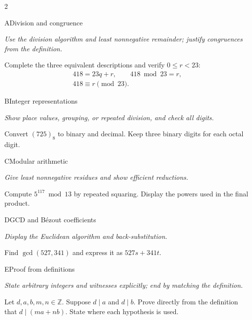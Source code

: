 \documentclass[9pt]{extarticle}
\begin{document}
\begin{multicols}{2}
\begin{CoreProblem}{A}{Division and congruence}
{\scriptsize\textit{Use the division algorithm and least nonnegative remainder; justify congruences from the definition.}\par}
Complete the three equivalent descriptions and verify $0\le r<23$:
\[
\begin{gathered}
418=23q+r,\qquad 418\bmod 23=r,\\
418\equiv r\pmod{23}.
\end{gathered}
\]
\end{CoreProblem}
\begin{CoreProblem}{B}{Integer representations}
{\scriptsize\textit{Show place values, grouping, or repeated division, and check all digits.}\par}
Convert $(725)_8$ to binary and decimal. Keep three binary digits for each
octal digit.
\end{CoreProblem}
\begin{CoreProblem}{C}{Modular arithmetic}
{\scriptsize\textit{Give least nonnegative residues and show efficient reductions.}\par}
Compute $5^{117}\bmod13$ by repeated squaring. Display the powers used in the
final product.
\end{CoreProblem}
\columnbreak
\begin{CoreProblem}{D}{GCD and B\'ezout coefficients}
{\scriptsize\textit{Display the Euclidean algorithm and back-substitution.}\par}
Find $\gcd(527,341)$ and express it as $527s+341t$.
\end{CoreProblem}
\begin{CoreProblem}{E}{Proof from definitions}
{\scriptsize\textit{State arbitrary integers and witnesses explicitly; end by matching the definition.}\par}
Let $d,a,b,m,n\in\mathbb Z$. Suppose $d\mid a$ and $d\mid b$. Prove directly
from the definition that $d\mid(ma+nb)$. State where each hypothesis is used.
\end{CoreProblem}
\end{multicols}
\CoreWorkArea
\FormBreak
{}
\end{document}
